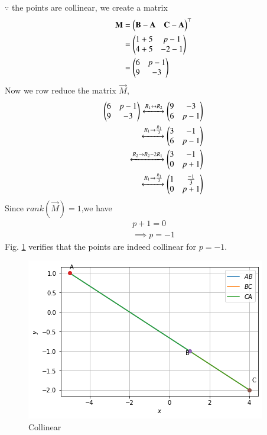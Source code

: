 
$\because $ the points are collinear, we create a matrix
\begin{align}
  \mathbf{M} &=  \begin{pmatrix}\mathbf{B}-\mathbf{A}&\mathbf{C}-\mathbf{A}\end{pmatrix}^{\top}
  \\
    & = \begin{pmatrix}1+5&p-1\\4+5&-2-1\end{pmatrix} \\
    & =   \begin{pmatrix}6&p-1\\9&-3\end{pmatrix}
\end{align}
Now we row reduce the matrix $\vec{M}$,
\begin{align}
\begin{pmatrix}6&p-1\\9&-3\end{pmatrix}
\xleftrightarrow{R_1\leftrightarrow R_2}
\begin{pmatrix}9&-3\\6&p-1\end{pmatrix}
\\
\xleftrightarrow{R_1\rightarrow \frac{R_1}{3}}
\begin{pmatrix}3&-1\\6&p-1\end{pmatrix}
\\
\xleftrightarrow{R_2\rightarrow R_2-2R_1}
\begin{pmatrix}3&-1\\0&p+1\end{pmatrix}
\\
\xleftrightarrow{R_1\rightarrow \frac{R_1}{3}}
\begin{pmatrix}1&\frac{-1}{3}\\0&p+1\end{pmatrix}
\end{align}
Since $rank(\vec{M})=1$,we have
\begin{align}
 p+1=0 \\
\implies p=-1
 \end{align}
 Fig. \ref{vec/2006/147Graphical solution}  verifies that the points are indeed collinear for $p = -1$.
\begin{figure}[ht]
    \centering
    \includegraphics[width=\columnwidth]{vectors/solutions/2006/17/collinear.png}
    \caption{Collinear}
    \label{vec/2006/147Graphical solution}
\end{figure}

 


